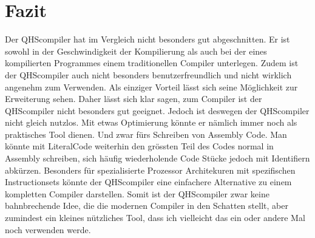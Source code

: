 \chapter{Fazit}
Der QHScompiler hat im Vergleich nicht besonders gut abgeschnitten. Er ist sowohl in der Geschwindigkeit der Kompilierung als auch bei der eines kompilierten Programmes einem traditionellen Compiler unterlegen.
Zudem ist der QHScompiler auch nicht besonders benutzerfreundlich und nicht wirklich angenehm zum Verwenden. Als einziger Vorteil lässt sich seine Möglichkeit zur Erweiterung sehen.
Daher lässt sich klar sagen, zum Compiler ist der QHScompiler nicht besonders gut geeignet. Jedoch ist deswegen der QHScompiler nicht gleich nutzlos. Mit etwas Optimierung könnte er nämlich immer noch als praktisches Tool dienen. 
Und zwar fürs Schreiben von Assembly Code. Man könnte mit LiteralCode weiterhin den grössten Teil des Codes normal in Assembly schreiben, sich häufig wiederholende Code Stücke jedoch mit Identifiern abkürzen.
Besonders für spezialisierte Prozessor Architekuren mit spezifischen Instructionsets könnte der QHScompiler eine einfachere Alternative zu einem kompletten Compiler darstellen.
Somit ist der QHScompiler zwar keine bahnbrechende Idee, die die modernen Compiler in den Schatten stellt, aber zumindest ein kleines nützliches Tool, dass ich vielleicht das ein oder andere Mal noch verwenden werde.

